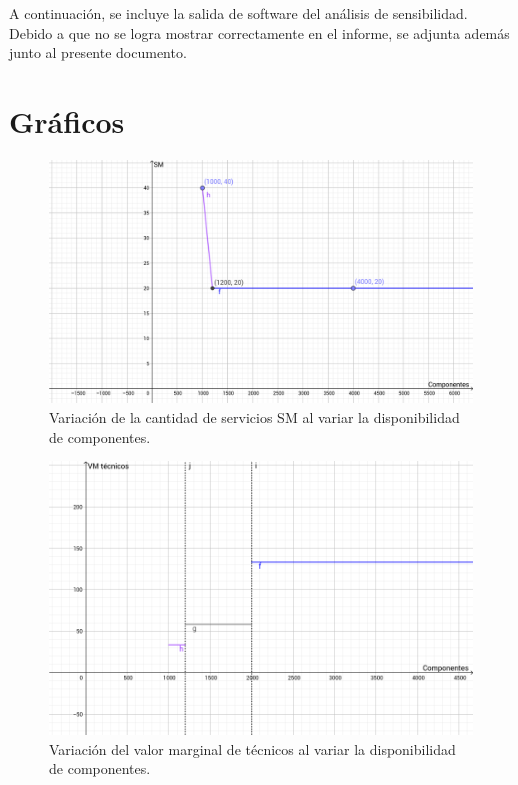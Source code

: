 \documentclass{article}
\begin{document}
\begin{enumerate}
		A continuaci\'on, se incluye la salida de software del an\'alisis de sensibilidad. Debido a que no se logra mostrar correctamente en el informe, se adjunta adem\'as junto al presente documento.

		
		
     	\smallskip
		\section{Gr\'aficos}
		\begin{figure}[H]
			\caption{Variaci\'on de la cantidad de servicios SM al variar la disponibilidad de componentes.}
			\includegraphics[scale=0.35]{SM.png}
		\end{figure}
		\smallskip
		\begin{figure}[H]
			\caption{Variaci\'on del valor marginal de t\'ecnicos al variar la disponibilidad de componentes.}
			\includegraphics[scale=0.35]{tecncosvm.png}

\end{figure}
\end{enumerate}
\end{document}
